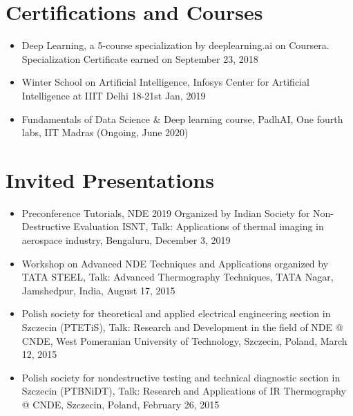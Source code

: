 \documentclass{my_cv}%
\begin{document}
\section{Certifications and Courses}
\vspace{1em}
\begin{itemize}[leftmargin=0.15in]
\setlength\itemsep{-0.1em}
\color{mygray}
\item Deep Learning, a 5-course specialization by deeplearning.ai on Coursera. Specialization Certificate earned on September 23, 2018
\item Winter School on Artificial Intelligence, Infosys Center for Artificial Intelligence at IIIT Delhi 18-21st Jan, 2019
\item Fundamentals of Data Science \& Deep learning course, PadhAI, One fourth labs, IIT Madras (Ongoing, June 2020)
\end{itemize}


\section{Invited Presentations}
\vspace{1em}
\begin{itemize}[leftmargin=0.15in]
\setlength\itemsep{-0.1em}
\color{mygray}
\item Preconference Tutorials, NDE 2019 Organized by Indian Society for Non-Destructive Evaluation ISNT, Talk: Applications of thermal imaging in aerospace industry, Bengaluru, December 3, 2019
\item Workshop on Advanced NDE Techniques and Applications organized by TATA STEEL, Talk: Advanced Thermography Techniques, TATA Nagar, Jamshedpur, India, August 17, 2015
\item Polish society for theoretical and applied electrical engineering section in Szczecin (PTETiS), Talk: Research and Development in the field of NDE @ CNDE, West Pomeranian University of Technology, Szczecin, Poland, March 12, 2015
\item Polish society for nondestructive testing and technical diagnostic section in Szczecin (PTBNiDT), Talk: Research and Applications of IR Thermography @ CNDE, Szczecin, Poland, February 26, 2015
\end{itemize}
\end{document}
